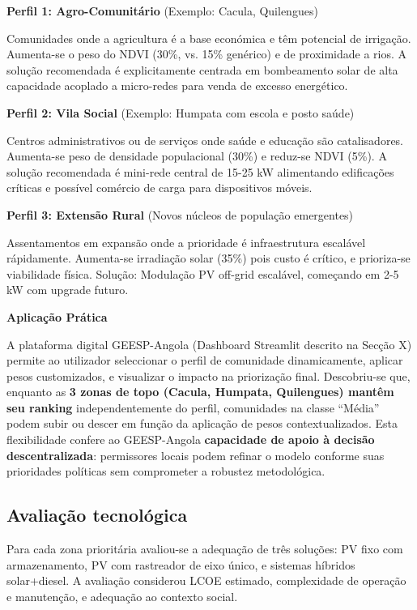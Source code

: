 \documentclass[12pt, a4paper]{article}
\begin{document}
\textbf{Perfil 1: Agro-Comunitário} (Exemplo: Cacula, Quilengues)

Comunidades onde a agricultura é a base económica e têm potencial de irrigação. 
Aumenta-se o peso do NDVI (30\%, vs. 15\% genérico) e de proximidade a rios. 
A solução recomendada é explicitamente centrada em bombeamento solar de alta capacidade 
acoplado a micro-redes para venda de excesso energético.

\textbf{Perfil 2: Vila Social} (Exemplo: Humpata com escola e posto saúde)

Centros administrativos ou de serviços onde saúde e educação são catalisadores. 
Aumenta-se peso de densidade populacional (30\%) e reduz-se NDVI (5\%). 
A solução recomendada é mini-rede central de 15-25 kW alimentando edificações críticas 
e possível comércio de carga para dispositivos móveis.

\textbf{Perfil 3: Extensão Rural} (Novos núcleos de população emergentes)

Assentamentos em expansão onde a prioridade é infraestrutura escalável rápidamente. 
Aumenta-se irradiação solar (35\%) pois custo é crítico, e prioriza-se viabilidade 
física. Solução: Modulação PV off-grid escalável, começando em 2-5 kW com upgrade futuro.

\textbf{Aplicação Prática}

A plataforma digital GEESP-Angola (Dashboard Streamlit descrito na Secção X) permite 
ao utilizador seleccionar o perfil de comunidade dinamicamente, aplicar pesos customizados, 
e visualizar o impacto na priorização final. Descobriu-se que, enquanto as \textbf{3 zonas 
de topo (Cacula, Humpata, Quilengues) mantêm seu ranking} independentemente do perfil, 
comunidades na classe ``Média'' podem subir ou descer em função da aplicação de pesos 
contextualizados. Esta flexibilidade confere ao GEESP-Angola \textbf{capacidade de apoio 
à decisão descentralizada}: permissores locais podem refinar o modelo conforme suas 
prioridades políticas sem comprometer a robustez metodológica.

\subsection{Avaliação tecnológica}

Para cada zona prioritária avaliou-se a adequação de três soluções: PV fixo com armazenamento, PV com rastreador de eixo único, e sistemas híbridos solar+diesel. A avaliação considerou LCOE estimado, complexidade de operação e manutenção, e adequação ao contexto social.
\end{document}
